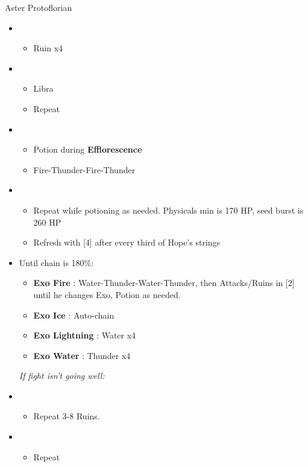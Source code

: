 \begin{battle}[1:45]{Aster Protoflorian}
		\begin{itemize}
			\item \first
			      \begin{itemize}
				      \item Ruin x4
			      \end{itemize}
			\item \third
			      \begin{itemize}
				      \item Libra
				      \item Repeat
			      \end{itemize}
			\item \fourth
			      \begin{itemize}
				      \item Potion during \textbf{Efflorescence}
				      \item Fire-Thunder-Fire-Thunder
			      \end{itemize}
			\item \fifth
			      \begin{itemize}
				      \item Repeat while potioning as needed. Physicals min is 170 HP, seed burst is 260 HP
				      \item Refresh with [4] after every third of Hope's strings
			      \end{itemize}
			\item Until chain is 180\%:
			      \begin{itemize}
				      \item \textbf{Exo Fire} : Water-Thunder-Water-Thunder, then Attacks/Ruins in [2] until he changes Exo, Potion as needed.
				      \item \textbf{Exo Ice} : Auto-chain
				      \item \textbf{Exo Lightning} : Water x4
				      \item \textbf{Exo Water} : Thunder x4
			      \end{itemize}
			      {\it If fight isn't going well:}
			\item \second
			      \begin{itemize}
				      \item Repeat 3-8 Ruins.
			      \end{itemize}
			\item \fourth
			      \begin{itemize}
				      \item Repeat

\end{itemize}
\end{itemize}
\end{battle}
